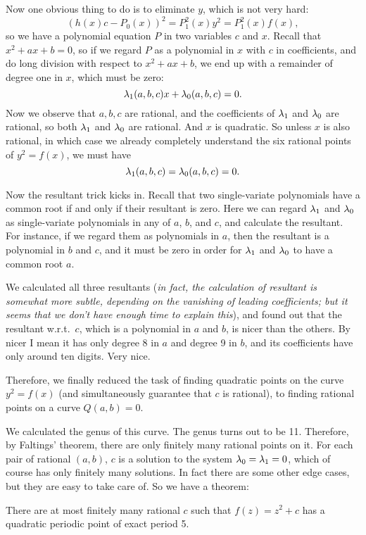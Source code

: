 Now one obvious thing to do is to eliminate $y$, which is not very
hard:
\[
(h(x) c - P_0(x))^2 = P_1^2(x) y^2 = P_1^2(x) f(x),
\]
so we have a polynomial equation $P$ in two variables $c$ and
$x$. Recall that $x^2 + ax + b = 0$, so if we regard $P$ as a
polynomial in $x$ with $c$ in coefficients, and do long division with
respect to $x^2 + ax + b$, we end up with a remainder of degree one in
$x$, which must be zero:
\[
\lambda_1(a, b, c) x + \lambda_0(a, b, c) = 0.
\]
Now we observe that $a, b, c$ are rational, and the coefficients of
$\lambda_1$ and $\lambda_0$ are rational, so both $\lambda_1$ and $\lambda_0$ are
rational. And $x$ is quadratic. So unless $x$ is also rational, in
which case we already completely understand the six rational points of
$y^2 = f(x)$, we must have
\[
\lambda_1(a, b, c) = \lambda_0(a, b, c) = 0.
\]

Now the resultant trick kicks in. Recall that two single-variate
polynomials have a common root if and only if their resultant is
zero. Here we can regard $\lambda_1$ and $\lambda_0$ as single-variate
polynomials in any of $a$, $b$, and $c$, and calculate the
resultant. For instance, if we regard them as polynomials in $a$, then
the resultant is a polynomial in $b$ and $c$, and it must be zero in
order for $\lambda_1$ and $\lambda_0$ to have a common root $a$.

We calculated all three resultants (\textit{in fact, the calculation
  of resultant is somewhat more subtle, depending on the vanishing of
  leading coefficients; but it seems that we don't have enough time to
  explain this}), and found out that the resultant w.r.t.\ $c$, which
is a polynomial in $a$ and $b$, is nicer than the others. By nicer I
mean it has only degree 8 in $a$ and degree 9 in $b$, and its
coefficients have only around ten digits. Very nice.

Therefore, we finally reduced the task of finding quadratic points on
the curve $y^2 = f(x)$ (and simultaneously guarantee that $c$ is
rational), to finding rational points on a curve $Q(a, b) = 0$.

We calculated the genus of this curve. The genus turns out to be
11. Therefore, by Faltings' theorem, there are only finitely many
rational points on it. For each pair of rational $(a, b)$, $c$ is a
solution to the system $\lambda_0 = \lambda_1 = 0$, which of course has only
finitely many solutions. In fact there are some other edge cases, but
they are easy to take care of. So we have a theorem:

\begin{theorem}
  There are at most finitely many rational $c$ such that $f(z) = z^2 +
  c$ has a quadratic periodic point of exact period 5.
\end{theorem}

